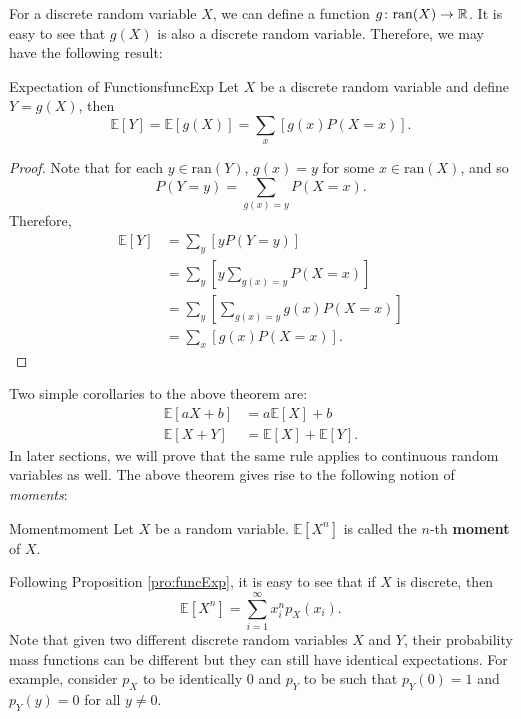 \documentclass[math]{amznotes}
\theoremstyle{remark}
\newcommand{\0}{\mathbf{0}}
\newcommand{\1}{\mathbf{1}}
\begin{document}
For a discrete random variable $X$, we can define a function $g \colon \mathrm{ran}(X) \to \mathbb{R}$. It is easy to see that $g(X)$ is also a discrete random variable. Therefore, we may have the following result:
\begin{probox}{Expectation of Functions}{funcExp}
    Let $X$ be a discrete random variable and define $Y = g(X)$, then
    \begin{equation*}
        \mathbb{E}[Y] = \mathbb{E}[g(X)] = \sum_{x}\left[g(x)P(X = x)\right].
    \end{equation*}
    \tcblower
    \begin{proof}
        Note that for each $y \in \mathrm{ran}(Y)$, $g(x) = y$ for some $x \in \mathrm{ran}(X)$, and so
        \begin{equation*}
            P(Y = y) = \sum_{g(x) = y}P(X = x).
        \end{equation*}
        Therefore,
        \begin{align*}
            \mathbb{E}[Y] & = \sum_{y}\left[yP(Y = y)\right] \\
            & = \sum_{y}\left[y\!\sum_{g(x) = y}\!P(X = x)\right] \\
            & = \sum_{y}\left[\sum_{g(x) = y}\!g(x)P(X = x)\right] \\
            & = \sum_{x}\left[g(x)P(X = x)\right].
        \end{align*}
    \end{proof}
\end{probox}
Two simple corollaries to the above theorem are:
\begin{align*}
    \mathbb{E}[aX + b] & = a\mathbb{E}[X] + b \\
    \mathbb{E}[X + Y] & = \mathbb{E}[X] + \mathbb{E}[Y].
\end{align*}
In later sections, we will prove that the same rule applies to continuous random variables as well. The above theorem gives rise to the following notion of \textit{moments}:
\begin{dfnbox}{Moment}{moment}
    Let $X$ be a random variable. $\mathbb{E}[X^n]$ is called the $n$-th {\color{red} \textbf{moment}} of $X$.
\end{dfnbox}
Following Proposition \ref{pro:funcExp}, it is easy to see that if $X$ is discrete, then
\begin{equation*}
    \mathbb{E}[X^n] = \sum_{i = 1}^{\infty}x_i^np_X(x_i).
\end{equation*}
Note that given two different discrete random variables $X$ and $Y$, their probability mass functions can be different but they can still have identical expectations. For example, consider $p_X$ to be identically $0$ and $p_Y$ to be such that $p_Y(0) = 1$ and $p_Y(y) = 0$ for all $y \neq 0$.
\end{document}
